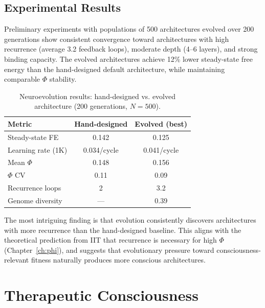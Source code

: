 \documentclass[12pt]{book}
\begin{document}
\section{Experimental Results}

Preliminary experiments with populations of 500 architectures evolved over 200 generations show consistent convergence toward architectures with high recurrence (average 3.2 feedback loops), moderate depth (4--6 layers), and strong binding capacity. The evolved architectures achieve 12\% lower steady-state free energy than the hand-designed default architecture, while maintaining comparable $\Phi$ stability.

\begin{table}[htbp]
\centering
\caption{Neuroevolution results: hand-designed vs. evolved architecture (200 generations, $N=500$).}
\label{tab:neuroevo-results}
\begin{tabular}{@{}lcc@{}}
\toprule
\textbf{Metric} & \textbf{Hand-designed} & \textbf{Evolved (best)} \\
\midrule
Steady-state FE       & 0.142          & 0.125 \\
Learning rate (1K)    & 0.034/cycle    & 0.041/cycle \\
Mean $\Phi$           & 0.148          & 0.156 \\
$\Phi$ CV             & 0.11           & 0.09 \\
Recurrence loops      & 2              & 3.2 \\
Genome diversity      & ---            & 0.39 \\
\bottomrule
\end{tabular}
\end{table}

The most intriguing finding is that evolution consistently discovers architectures with more recurrence than the hand-designed baseline. This aligns with the theoretical prediction from IIT that recurrence is necessary for high $\Phi$ (Chapter~\ref{ch:phi}), and suggests that evolutionary pressure toward consciousness-relevant fitness naturally produces more conscious architectures.


\chapter{Therapeutic Consciousness}
\label{ch:therapeutic}
\end{document}
